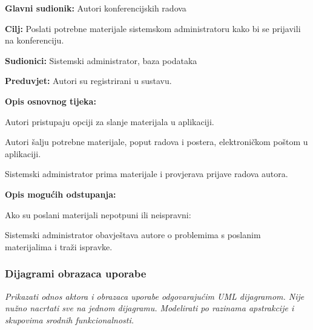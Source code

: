 					\noindent {}
					\begin{packed_item}
						\item \textbf{Glavni sudionik:} Autori konferencijskih radova
						\item \textbf{Cilj:} Poslati potrebne materijale sistemskom administratoru kako bi se prijavili na konferenciju.
						\item \textbf{Sudionici:} Sistemski administrator, baza podataka
						\item \textbf{Preduvjet:} Autori su registrirani u sustavu.
						\item \textbf{Opis osnovnog tijeka:}
						
						\begin{packed_enum}
							\item Autori pristupaju opciji za slanje materijala u aplikaciji.
							\item Autori šalju potrebne materijale, poput radova i postera, elektroničkom poštom u aplikaciji.
							\item Sistemski administrator prima materijale i provjerava prijave radova autora.
						\end{packed_enum}
						
						\item \textbf{Opis mogućih odstupanja:}
						
						\begin{packed_item}
							\item[2.a] Ako su poslani materijali nepotpuni ili neispravni:
							\begin{packed_enum}
								\item Sistemski administrator obavještava autore o problemima s poslanim materijalima i traži ispravke.
							\end{packed_enum}
						\end{packed_item}
					\end{packed_item}
					
				
					
				\subsubsection{Dijagrami obrazaca uporabe}
					
					\textit{Prikazati odnos aktora i obrazaca uporabe odgovarajućim UML dijagramom. Nije nužno nacrtati sve na jednom dijagramu. Modelirati po razinama apstrakcije i skupovima srodnih funkcionalnosti.}
					
